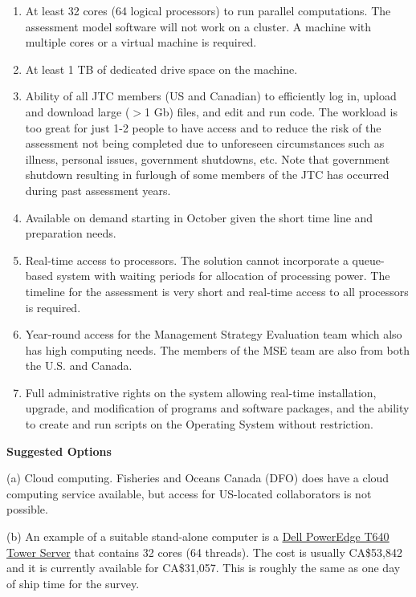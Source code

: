 \documentclass[12pt]{book}\usepackage[]{graphicx}\usepackage[]{color}
\begin{document}
\begin{enumerate}

  \item At least 32 cores (64 logical processors) to run parallel computations.
    The assessment model software will not work on a cluster. A machine with
    multiple cores or a virtual machine is required.

 \item At least 1 TB of dedicated drive space on the machine.

  \item Ability of all JTC members (US and Canadian) to efficiently log in,
    upload and download large ($>$1 Gb) files, and edit and run code.
    The workload is too great for just 1-2 people to have access
    and to reduce the risk of the
    assessment not being completed due to unforeseen circumstances
    such as illness, personal issues, government shutdowns, etc. Note that
    government shutdown resulting in furlough of some members of the JTC has
    occurred during past assessment years.

  \item Available on demand starting in October given
    the short time line and preparation needs.

  \item Real-time access to processors. The solution cannot incorporate a
    queue-based system with waiting periods for allocation of processing power.
    The timeline for the assessment is very short and real-time access to all
    processors is required.

  \item Year-round access for the Management Strategy Evaluation team which also
    has high computing needs. The members of the MSE team are also from both
    the U.S. and Canada.

  \item Full administrative rights on the system allowing real-time installation,
    upgrade, and modification of programs and software packages, and the ability to
    create and run scripts on the Operating System without restriction.

\end{enumerate}

{\bf Suggested Options}

(a) Cloud computing. Fisheries and Oceans Canada (DFO) does have a cloud
computing service available, but access for US-located collaborators is not possible.

(b) An example of a suitable stand-alone computer is a
\href{http://bit.ly/hake-power-computer}{\underline{Dell PowerEdge T640 Tower Server}}
that contains 32 cores (64 threads). The cost is usually CA\$53,842 and it is
currently available for CA\$31,057. This is roughly the same as one day of ship
time for the survey.
\end{document}
